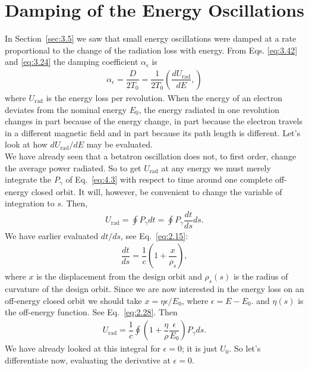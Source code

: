 \section{Damping of the Energy Oscillations}\label{sec:4.2}

In Section~\ref{sec:3.5} we saw that small energy oscillations were damped at a rate proportional
 to the change of the radiation loss with energy. From Eqs. \eqref{eq:3.42} and \eqref{eq:3.24} the damping coefficient $\alpha_\epsilon$ is
\begin{align}
	\alpha_\epsilon = \dfrac{D}{2 T_0} = \dfrac{1}{2 T_0} \left( \dfrac{d U_\text{rad}}{d E}, \right)
\end{align}
where $U_\text{rad}$ is the energy loss per revolution. When the energy of an electron deviates from the nominal energy $E_0$, the energy radiated in one revolution changes in part because of the energy change, in part because the electron travels in a different magnetic field and in part because its path length is different. Let’s look at how $dU_\text{rad}/dE$ may be evaluated.\\
We have already seen that a betatron oscillation does not, to first order, change the average power radiated. So to get $U_\text{rad}$ at any energy we must merely integrate the $P_\gamma$ of Eq.~\eqref{eq:4.3} with respect to time around one complete off-energy closed orbit. It will, however, be convenient to change the variable of integration to $s$. Then,
\begin{align}
	U_\text{rad} = \oint P_\gamma dt = \oint P_\gamma \dfrac{dt}{ds} ds.
\end{align}
We have earlier evaluated $dt/ds$, see Eq.~\eqref{eq:2.15}:
\begin{align*}
	\dfrac{dt}{ds} = \dfrac{1}{c} \left( 1 + \dfrac{x}{\rho_s} \right),
\end{align*}
where $x$ is the displacement from the design orbit and $\rho_s(s)$ is the radius of curvature of the design orbit. Since we are now interested in the energy loss on an off-energy closed orbit we should take $x = \eta \epsilon/E_0$, where $\epsilon = E - E_0$. and $\eta(s)$ is
the off-energy function. See Eq.~\eqref{eq:2.28}. Then
\begin{align}
	U_\text{rad} = \dfrac{1}{c} \oint \left( 1 + \dfrac{\eta}{\rho} \dfrac{\epsilon}{E_0} \right) P_\gamma ds.
\end{align}
We have already looked at this integral for $\epsilon = 0$; it is just $U_0$. So let’s differentiate now, evaluating the derivative at $\epsilon = 0$.
